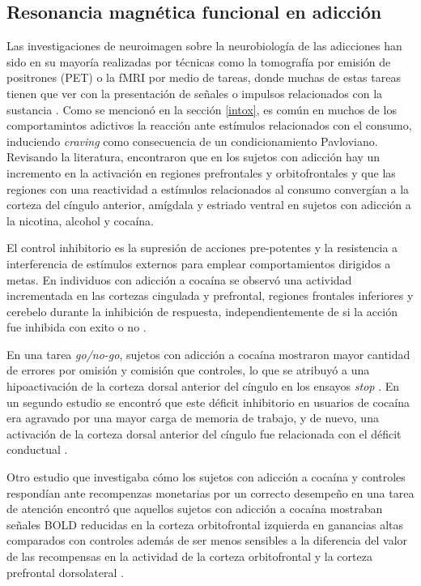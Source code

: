 \subsection{Resonancia magnética funcional en adicción}
Las investigaciones de neuroimagen sobre la neurobiología de las adicciones han sido en su mayoría realizadas por técnicas como la tomografía por emisión de positrones (PET) o la fMRI por medio de tareas, donde muchas de estas tareas tienen que ver con la presentación de señales o impulsos relacionados con la sustancia \parencite{Jasinska2014}.
Como se mencionó en la sección \ref{intox}, es común en muchos de los comportamintos adictivos la reacción ante estímulos relacionados con el consumo, induciendo \textit{craving} como consecuencia de un condicionamiento Pavloviano. Revisando la literatura, \textcite{Suckling2017} encontraron que en los sujetos con adicción hay un incremento en la activación en regiones prefrontales y orbitofrontales y que las regiones con una reactividad a estímulos relacionados al consumo convergían a la corteza del cíngulo anterior, amígdala y estriado ventral en sujetos con adicción a la nicotina, alcohol y cocaína. \par
El control inhibitorio es la supresión de acciones pre-potentes y la resistencia a interferencia de estímulos externos para emplear comportamientos dirigidos a metas.
En individuos con adicción a cocaína se observó una actividad incrementada en las cortezas cingulada y prefrontal, regiones frontales inferiores y cerebelo durante la inhibición de respuesta, independientemente de si la acción fue inhibida con exito o no \parencite{Suckling2017}.\par
En una tarea \textit{go/no-go}, sujetos con adicción a cocaína mostraron mayor cantidad de errores por omisión y comisión que controles, lo que se atribuyó a una hipoactivación de la corteza dorsal anterior del cíngulo en los ensayos \textit{stop} \parencite{Kaufman2003}.
En un segundo estudio se encontró que este déficit inhibitorio en usuarios de cocaína era agravado por una mayor carga de memoria de trabajo, y de nuevo, una activación de la corteza dorsal anterior del cíngulo fue relacionada con el déficit conductual \parencite{Hester2004}.\par
Otro estudio que investigaba cómo los sujetos con adicción a cocaína y controles respondían ante recompenzas monetarias por un correcto desempeño en una tarea de atención encontró que aquellos sujetos con adicción a cocaína mostraban señales BOLD reducidas en la corteza orbitofrontal izquierda en ganancias altas comparados con controles además de ser menos sensibles a la diferencia del valor de las recompensas en la actividad de la corteza orbitofrontal y la corteza prefrontal dorsolateral \parencite{Goldstein2007}. \par
